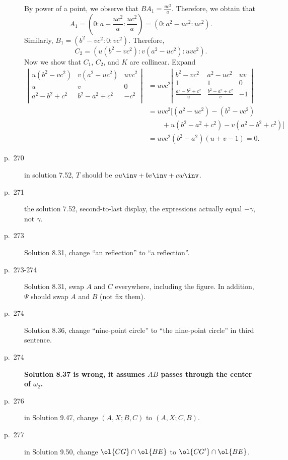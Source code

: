 \documentclass[11pt]{scrartcl}
\newcommand{\crucial}[1]{\textbf{\sffamily\large\color{red} #1}}
\begin{document}
\begin{description}
  By power of a point, we observe that $BA_1 = \frac{uc^2}{a}$.
  Therefore, we obtain that
  \[ A_1 = \left( 0:a-\frac{uc^2}{a}: \frac{uc^2}{a} \right)
    = \left( 0:a^{2}-uc^2 : uc^2 \right). \]
  Similarly, $B_1 = \left( b^2-vc^2 : 0 : vc^2 \right)$.
  Therefore,
  \[ C_2 = \left( u(b^2-vc^2) : v(a^2-uc^2) : uvc^2 \right). \]
  Now we show that $C_1$, $C_2$, and $K$ are collinear.
  Expand
  \begin{align*}
  \left\lvert
  \begin{array}{ccc}
    u (b^2-vc^2) & v (a^2-uc^2) & uv c^2 \\
    u & v & 0 \\
    a^2-b^2+c^2 & b^2-a^2+c^2 & -c^2 \\
  \end{array}
  \right\rvert
  &= uvc^2 \left\lvert
  \begin{array}{ccc}
    b^2-vc^2 & a^2-uc^2 & uv \\
    1 & 1 & 0 \\
    \frac{a^2-b^2+c^2}{u} & \frac{b^2-a^2+c^2}{v} & -1 \\
  \end{array}
  \right\rvert \\
  &= uvc^2 \Big[ (a^2-uc^2)-(b^2-vc^2) \\
    &\qquad+ u(b^2-a^2+c^2) - v(a^2-b^2+c^2) \Big] \\
    &= uvc^2 (b^2-a^2)(u+v-1) = 0.
  \end{align*}
\item[p.\  270] in solution 7.52, $T$ should be $au\inv+bv\inv+cw\inv$.
\item[p.\  271] the solution 7.52, second-to-last display,
  the expressions actually equal $-\gamma$, not $\gamma$.
\item[p.\ 273] Solution 8.31, change ``an reflection'' to ``a reflection''.
\item[p.\ 273-274] Solution 8.31, swap $A$ and $C$ everywhere, including the figure.
  In addition, $\Psi$ should swap $A$ and $B$ (not fix them).
\item[p.\  274] Solution 8.36, change ``nine-point circle''
  to ``the nine-point circle'' in third sentence.
\item[p.\  274] \crucial{Solution 8.37 is wrong,
  it assumes $AB$ passes through the center of $\omega_2$.}
\item[p.\  276] in Solution 9.47, change $(A,X;B,C)$ to $(A,X;C,B)$.
\item[p.\  277] in Solution 9.50, change $\ol{CG} \cap \ol{BE}$ to $\ol{CG'} \cap \ol{BE}$.

\end{description}
\end{document}
